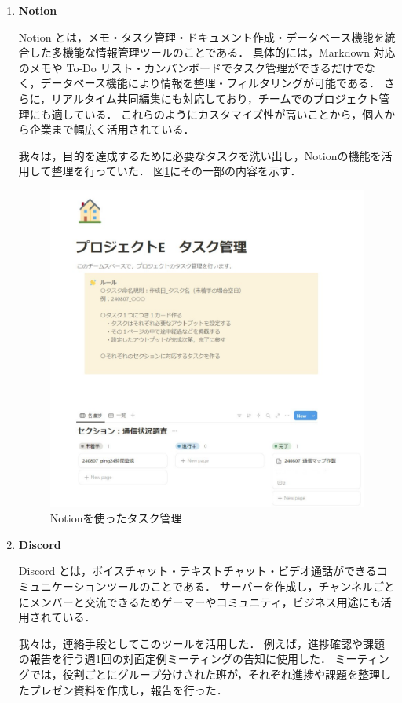 \begin{enumerate}
	\item \textbf{Notion}
	
	Notion とは，メモ・タスク管理・ドキュメント作成・データベース機能を統合した多機能な情報管理ツールのことである\cite{Notion}．
	具体的には，Markdown 対応のメモや To-Do リスト・カンバンボードでタスク管理ができるだけでなく，データベース機能により情報を整理・フィルタリングが可能である．
	さらに，リアルタイム共同編集にも対応しており，チームでのプロジェクト管理にも適している．
	これらのようにカスタマイズ性が高いことから，個人から企業まで幅広く活用されている．
	
	我々は，目的を達成するために必要なタスクを洗い出し，Notionの機能を活用して整理を行っていた．
	図\ref{fig:Notionを使ったタスク管理}にその一部の内容を示す．
	\begin{figure}[tb]
		\centering
		\includegraphics[scale=0.45]{./fig/notion.pdf}
		\caption{Notionを使ったタスク管理}
		\label{fig:Notionを使ったタスク管理}
	\end{figure}
	
	\item \textbf{Discord}
	
	Discord とは，ボイスチャット・テキストチャット・ビデオ通話ができるコミュニケーションツールのことである\cite{Discord}．
	サーバーを作成し，チャンネルごとにメンバーと交流できるためゲーマーやコミュニティ，ビジネス用途にも活用されている．
	
	我々は，連絡手段としてこのツールを活用した．
	例えば，進捗確認や課題の報告を行う週1回の対面定例ミーティングの告知に使用した．
	ミーティングでは，役割ごとにグループ分けされた班が，それぞれ進捗や課題を整理したプレゼン資料を作成し，報告を行った．
\end{enumerate}

